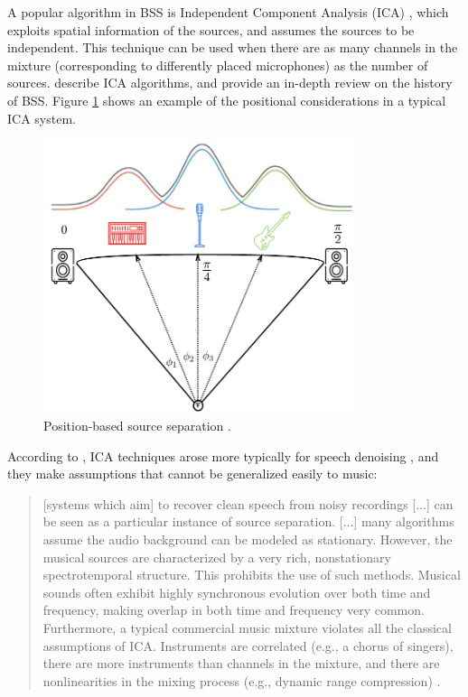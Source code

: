 \documentclass[report.tex]{subfiles}
\begin{document}
A popular algorithm in BSS is Independent Component Analysis (ICA) \parencite{musicmask, musicsepgood, musicsepintro1}, which exploits spatial information of the sources, and assumes the sources to be independent. This technique can be used when there are as many channels in the mixture (corresponding to differently placed microphones) as the number of sources. \textcite{ica1, ica2} describe ICA algorithms, and \textcite{blind1, blind2} provide an in-depth review on the history of BSS. Figure \ref{fig:icaposition} shows an example of the positional considerations in a typical ICA system.

\begin{figure}[ht]
	\centering
	\includegraphics[height=8cm]{./images-mss/positional.png}
	\caption{Position-based source separation \parencite[35]{musicsepgood}.}
\label{fig:icaposition}
\end{figure}

According to \citeauthor{musicsepintro1}, ICA techniques arose more typically for speech denoising \parencite{speechsep}, and they make assumptions that cannot be generalized easily to music:

\begin{quote}
	[systems which aim] to recover clean speech from noisy recordings [...] can be seen as a particular instance of source separation. [...] many algorithms assume the audio background can be modeled as stationary. However, the musical sources are characterized by a very rich, nonstationary spectrotemporal structure. This prohibits the use of such methods. Musical sounds often exhibit highly synchronous evolution over both time and frequency, making overlap in both time and frequency very common. Furthermore, a typical commercial music mixture violates all the classical assumptions of ICA. Instruments are correlated (e.g., a chorus of singers), there are more instruments than channels in the mixture, and there are nonlinearities in the mixing process (e.g., dynamic range compression) \parencite[1]{musicsepintro1}.
\end{quote}
\end{document}
